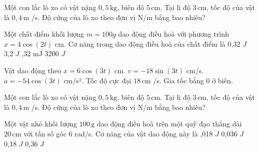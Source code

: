\begin{ex}
Một con lắc lò xo có vật nặng $0,5\,\text{kg}$, biên độ $5\,\text{cm}$. Tại li độ $3\,\text{cm}$, tốc độ của vật là $0,4\,\text{m}$ /s. Độ cứng của lò xo theo đơn vị N/m bằng bao nhiêu?
\end{ex}

\begin{ex}
Một chất điểm khối lượng $m=100g$ dao động điều hoà với phương trình $x=4\cos (2t)$ cm. Cơ năng trong dao động điều hoà của chất điểm là
\choice
{0,32 $J$}
{3,2 $J$}
{,32 mJ}
{3200 $J$}
\end{ex}

\begin{ex}
Vật dao động theo $x=6\cos(3t)$ cm.
\choiceTF
{\True $v=-18\sin(3t)$ cm/s.}
{\True $a=-54\cos(3t)$ cm/s².}
{\True Tốc độ cực đại $18\,\text{cm}$ /s.}
{Gia tốc bằng 0 ở biên.}
\end{ex}

\begin{ex}
Một con lắc lò xo có vật nặng $0,5\,\text{kg}$, biên độ $5\,\text{cm}$. Tại li độ $3\,\text{cm}$, tốc độ của vật là $0,4\,\text{m}$ /s. Độ cứng của lò xo theo đơn vị N/m bằng bao nhiêu?
\end{ex}

\begin{ex}
Một vật nhỏ khối lượng $100\,\text{g}$ dao động điều hoà trên một quỹ đạo thẳng dài $20\,\text{cm}$ với tần số góc 6 rad/s. Cơ năng của vật dao động này là
\choice
{,018 $J$}
{0,036 $J$}
{0,18 $J$}
{0,36 $J$}
\end{ex}

